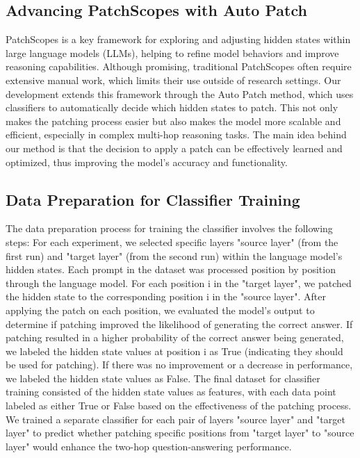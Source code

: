 \documentclass[11pt]{article}
\begin{document}
\subsection{Advancing PatchScopes with Auto Patch}
PatchScopes is a key framework for exploring and adjusting hidden states within large language models (LLMs), helping to refine model behaviors and improve reasoning capabilities. Although promising, traditional PatchScopes often require extensive manual work, which limits their use outside of research settings. Our development extends this framework through the Auto Patch method, which uses classifiers to automatically decide which hidden states to patch. This not only makes the patching process easier but also makes the model more scalable and efficient, especially in complex multi-hop reasoning tasks. The main idea behind our method is that the decision to apply a patch can be effectively learned and optimized, thus improving the model’s accuracy and functionality.

\subsection{Data Preparation for Classifier Training}
The data preparation process for training the classifier involves the following steps:
For each experiment, we selected specific layers "source layer" (from the first run) and "target layer" (from the second run) within the language model's hidden states. Each prompt in the dataset was processed position by position through the language model. For each position i in the "target layer", we patched the hidden state to the corresponding position i in the "source layer".
After applying the patch on each position, we evaluated the model's output to determine if patching improved the likelihood of generating the correct answer. If patching resulted in a higher probability of the correct answer being generated, we labeled the hidden state values at position i as True (indicating they should be used for patching). If there was no improvement or a decrease in performance, we labeled the hidden state values as False.
The final dataset for classifier training consisted of the hidden state values as features, with each data point labeled as either True or False based on the effectiveness of the patching process. We trained a separate classifier for each pair of layers "source layer" and "target layer" to predict whether patching specific positions from "target layer" to "source layer" would enhance the two-hop question-answering performance.
\end{document}
